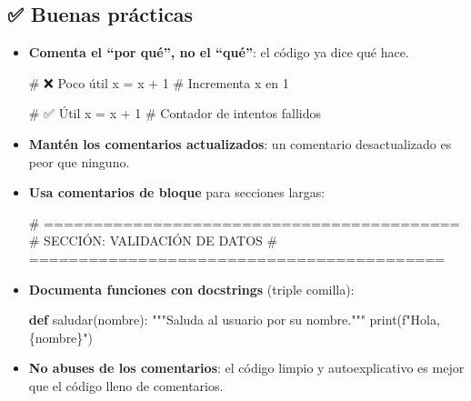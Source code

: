 \documentclass[
  doc,
  floatsintext,
  longtable,
  a4paper,
  nolmodern,
  notxfonts,
  notimes,
  12pt,
  colorlinks=true,linkcolor=blue,citecolor=blue,urlcolor=blue]{apa7}
\newenvironment{Shaded}{\begin{snugshade}}{\end{snugshade}}
\newcommand{\BuiltInTok}[1]{\textcolor[rgb]{0.00,0.23,0.31}{#1}}
\newcommand{\CommentTok}[1]{\textcolor[rgb]{0.37,0.37,0.37}{#1}}
\newcommand{\DecValTok}[1]{\textcolor[rgb]{0.68,0.00,0.00}{#1}}
\newcommand{\KeywordTok}[1]{\textcolor[rgb]{0.00,0.23,0.31}{\textbf{#1}}}
\newcommand{\NormalTok}[1]{\textcolor[rgb]{0.00,0.23,0.31}{#1}}
\newcommand{\OperatorTok}[1]{\textcolor[rgb]{0.37,0.37,0.37}{#1}}
\newcommand{\SpecialCharTok}[1]{\textcolor[rgb]{0.37,0.37,0.37}{#1}}
\newcommand{\SpecialStringTok}[1]{\textcolor[rgb]{0.13,0.47,0.30}{#1}}
\begin{document}
\subsection{✅ Buenas prácticas}\label{buenas-pruxe1cticas}

\begin{itemize}
\item
  \textbf{Comenta el ``por qué'', no el ``qué''}: el código ya dice qué
  hace.

\begin{Shaded}
\begin{Highlighting}[]
\CommentTok{\# ❌ Poco útil}
\NormalTok{x }\OperatorTok{=}\NormalTok{ x }\OperatorTok{+} \DecValTok{1}  \CommentTok{\# Incrementa x en 1}

\CommentTok{\# ✅ Útil}
\NormalTok{x }\OperatorTok{=}\NormalTok{ x }\OperatorTok{+} \DecValTok{1}  \CommentTok{\# Contador de intentos fallidos}
\end{Highlighting}
\end{Shaded}
\item
  \textbf{Mantén los comentarios actualizados}: un comentario
  desactualizado es peor que ninguno.
\item
  \textbf{Usa comentarios de bloque} para secciones largas:

\begin{Shaded}
\begin{Highlighting}[]
\CommentTok{\# ==========================================}
\CommentTok{\# SECCIÓN: VALIDACIÓN DE DATOS}
\CommentTok{\# ==========================================}
\end{Highlighting}
\end{Shaded}
\item
  \textbf{Documenta funciones con docstrings} (triple comilla):

\begin{Shaded}
\begin{Highlighting}[]
\KeywordTok{def}\NormalTok{ saludar(nombre):}
    \CommentTok{"""Saluda al usuario por su nombre."""}
    \BuiltInTok{print}\NormalTok{(}\SpecialStringTok{f"Hola, }\SpecialCharTok{\{}\NormalTok{nombre}\SpecialCharTok{\}}\SpecialStringTok{"}\NormalTok{)}
\end{Highlighting}
\end{Shaded}
\item
  \textbf{No abuses de los comentarios}: el código limpio y
  autoexplicativo es mejor que el código lleno de comentarios.
\end{itemize}
\end{document}
